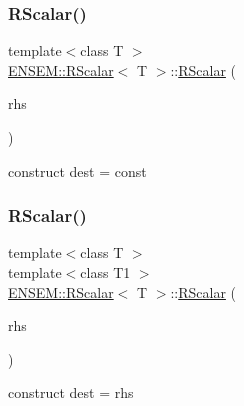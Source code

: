 \subsubsection{\texorpdfstring{RScalar()}{RScalar()}\hspace{0.1cm}{\footnotesize\ttfamily [12/15]}}
{\footnotesize\ttfamily template$<$class T $>$ \\
\mbox{\hyperlink{classENSEM_1_1RScalar}{E\+N\+S\+E\+M\+::\+R\+Scalar}}$<$ T $>$\+::\mbox{\hyperlink{classENSEM_1_1RScalar}{R\+Scalar}} (\begin{DoxyParamCaption}\item[{const typename \mbox{\hyperlink{structENSEM_1_1WordType}{Word\+Type}}$<$ T $>$\+::Type\+\_\+t \&}]{rhs }\end{DoxyParamCaption})\hspace{0.3cm}{\ttfamily [inline]}}



construct dest = const 

\mbox{\label{classENSEM_1_1RScalar_a93e56021a00d35af008ae72de2eb60f2}} 
\subsubsection{\texorpdfstring{RScalar()}{RScalar()}\hspace{0.1cm}{\footnotesize\ttfamily [13/15]}}
{\footnotesize\ttfamily template$<$class T $>$ \\
template$<$class T1 $>$ \\
\mbox{\hyperlink{classENSEM_1_1RScalar}{E\+N\+S\+E\+M\+::\+R\+Scalar}}$<$ T $>$\+::\mbox{\hyperlink{classENSEM_1_1RScalar}{R\+Scalar}} (\begin{DoxyParamCaption}\item[{const \mbox{\hyperlink{classENSEM_1_1RScalar}{R\+Scalar}}$<$ T1 $>$ \&}]{rhs }\end{DoxyParamCaption})\hspace{0.3cm}{\ttfamily [inline]}}



construct dest = rhs 

\mbox{\label{classENSEM_1_1RScalar_aef7513413ed5dbf6bb8bc37b73b88d00}} 

